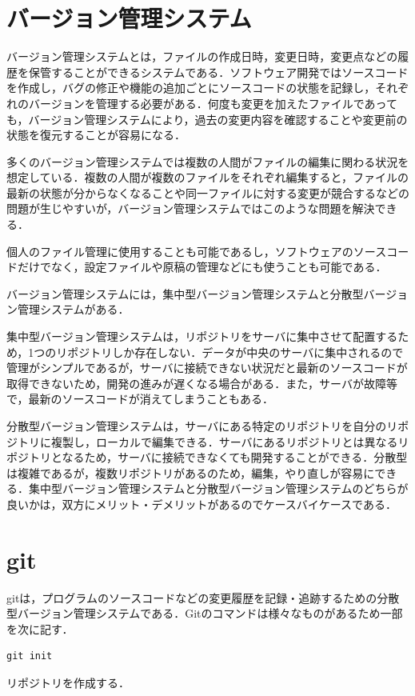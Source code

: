 \section{バージョン管理システム}
バージョン管理システムとは，ファイルの作成日時，変更日時，変更点などの履歴を保管することができるシステムである．ソフトウェア開発ではソースコードを作成し，バグの修正や機能の追加ごとにソースコードの状態を記録し，それぞれのバージョンを管理する必要がある．何度も変更を加えたファイルであっても，バージョン管理システムにより，過去の変更内容を確認することや変更前の状態を復元することが容易になる．

多くのバージョン管理システムでは複数の人間がファイルの編集に関わる状況を想定している．複数の人間が複数のファイルをそれぞれ編集すると，ファイルの最新の状態が分からなくなることや同一ファイルに対する変更が競合するなどの問題が生じやすいが，バージョン管理システムではこのような問題を解決できる．

個人のファイル管理に使用することも可能であるし，ソフトウェアのソースコードだけでなく，設定ファイルや原稿の管理などにも使うことも可能である．

バージョン管理システムには，集中型バージョン管理システムと分散型バージョン管理システムがある．

集中型バージョン管理システムは，リポジトリをサーバに集中させて配置するため，1つのリポジトリしか存在しない．データが中央のサーバに集中されるので管理がシンプルであるが，サーバに接続できない状況だと最新のソースコードが取得できないため，開発の進みが遅くなる場合がある．また，サーバが故障等で，最新のソースコードが消えてしまうこともある．

分散型バージョン管理システムは，サーバにある特定のリポジトリを自分のリポジトリに複製し，ローカルで編集できる．サーバにあるリポジトリとは異なるリポジトリとなるため，サーバに接続できなくても開発することができる．分散型は複雑であるが，複数リポジトリがあるのため，編集，やり直しが容易にできる．集中型バージョン管理システムと分散型バージョン管理システムのどちらが良いかは，双方にメリット・デメリットがあるのでケースバイケースである\cite{version}．

\newpage

\section{git}
gitは，プログラムのソースコードなどの変更履歴を記録・追跡するための分散型バージョン管理システムである．Gitのコマンドは様々なものがあるため一部を次に記す．

\hfil
\begin{lstlisting}[basicstyle=\ttfamily\footnotesize, frame=single]
git init
\end{lstlisting}
リポジトリを作成する．

